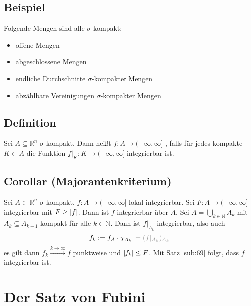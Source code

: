 \subsection[Beispiel: $\sigma$-kompakte Mengen]{Beispiel} %
\label{sub:613}
Folgende Mengen sind alle $\sigma$-kompakt:
\begin{multicols}{2}
	\begin{itemize}
		\item offene Mengen
		\item abgeschlossene Mengen
		\item endliche Durchschnitte $\sigma$-kompakter Mengen
		\item abzählbare Vereinigungen $\sigma$-kompakter Mengen
	\end{itemize}
\end{multicols}

\subsection[Definition: lokal integrierbar]{Definition} %
\label{sub:614}
Sei $A \subseteq \mathds{R}^n$ $\sigma$-kompakt. Dann heißt $f : A \to (-\infty, \infty]$ , falls für jedes kompakte $K \subset A$ die Funktion
$f|_K : K \to (-\infty,\infty]$ integrierbar ist.

\subsection{Corollar (Majorantenkriterium)} %
\label{sub:615}
Sei $A \subset \mathds{R}^n$ $\sigma$-kompakt, $f : A \to (-\infty, \infty]$ lokal integrierbar. Sei $F : A \to (-\infty, \infty]$ integrierbar mit $F\ge \lvert f\rvert $.
Dann ist $f$ integrierbar über $A$.
Sei $A= \bigcup_{k \in \mathds{N}} A_k$ mit $A_k \subseteq A_{k+1}$ kompakt für alle $k \in \mathds{N}$. Dann ist $f|_{A_k}$ integrierbar, also auch 
\[
	f_k := f_A \cdot \chi_{A_k} \enspace{\color{light_gray} = (f|_{A_k})_{A_k}}
\]
es gilt dann $f_k \xrightarrow{k \to \infty}  f$ punktweise und $\lvert f_k\rvert \le F $. Mit Satz \ref{sub:69} folgt, dass $f$ integrierbar ist. \bewende
\newpage

\section{Der Satz von Fubini} %
\label{sec:7}
